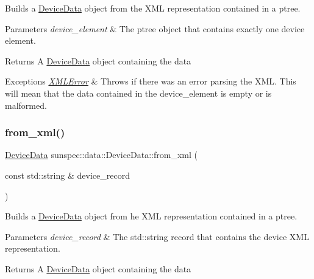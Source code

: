Builds a {\ttfamily \hyperlink{structsunspec_1_1data_1_1_device_data}{Device\+Data}} object from the X\+ML representation contained in a {\ttfamily ptree}. 
\begin{DoxyParams}{Parameters}
{\em device\+\_\+element} & The {\ttfamily ptree} object that contains exactly one device element. \\
\hline
\end{DoxyParams}
\begin{DoxyReturn}{Returns}
A {\ttfamily \hyperlink{structsunspec_1_1data_1_1_device_data}{Device\+Data}} object containing the data 
\end{DoxyReturn}

\begin{DoxyExceptions}{Exceptions}
{\em \hyperlink{classsunspec_1_1data_1_1_x_m_l_error}{X\+M\+L\+Error}} & Throws if there was an error parsing the X\+ML. This will mean that the data contained in the {\ttfamily device\+\_\+element} is empty or is malformed. \\
\hline
\end{DoxyExceptions}
\mbox{\label{structsunspec_1_1data_1_1_device_data_afefe7462c600a9219c04867dce19d5e3}} 
\subsubsection{\texorpdfstring{from\+\_\+xml()}{from\_xml()}\hspace{0.1cm}{\footnotesize\ttfamily [2/2]}}
{\footnotesize\ttfamily \hyperlink{structsunspec_1_1data_1_1_device_data}{Device\+Data} sunspec\+::data\+::\+Device\+Data\+::from\+\_\+xml (\begin{DoxyParamCaption}\item[{const std\+::string \&}]{device\+\_\+record }\end{DoxyParamCaption})\hspace{0.3cm}{\ttfamily [static]}}

Builds a {\ttfamily \hyperlink{structsunspec_1_1data_1_1_device_data}{Device\+Data}} object from he X\+ML representation contained in a {\ttfamily ptree}. 
\begin{DoxyParams}{Parameters}
{\em device\+\_\+record} & The {\ttfamily std\+::string} record that contains the device X\+ML representation. \\
\hline
\end{DoxyParams}
\begin{DoxyReturn}{Returns}
A {\ttfamily \hyperlink{structsunspec_1_1data_1_1_device_data}{Device\+Data}} object containing the data 
\end{DoxyReturn}

